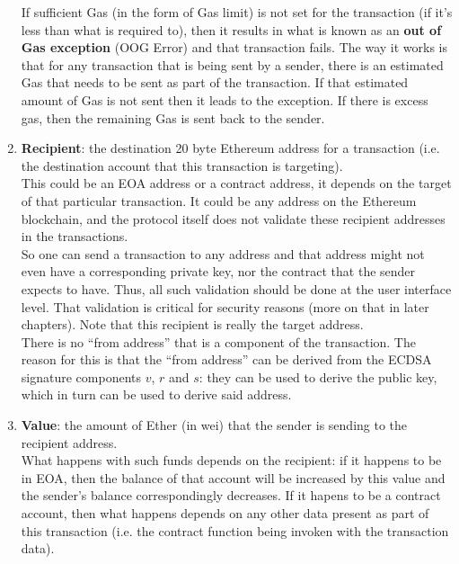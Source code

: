 \begin{enumerate}
    If sufficient Gas (in the form of Gas limit) is not set for the transaction (if it's less than what is required to), then it results in what is known as an \textbf{out of Gas exception} (OOG Error) and that transaction fails.
    The way it works is that for any transaction that is being sent by a sender, there is an estimated Gas that needs to be sent as part of the transaction.
    If that estimated amount of Gas is not sent then it leads to the exception.
    If there is excess gas, then the remaining Gas is sent back to the sender.

    \item\textbf{Recipient}: the destination 20 byte Ethereum address for a transaction (i.e. the destination account that this transaction is targeting).\\
    
    This could be an EOA address or a contract address, it depends on the target of that particular transaction.
    It could be any address on the Ethereum blockchain, and the protocol itself does not validate these recipient addresses in the transactions.\\

    So one can send a transaction to any address and that address might not even have a corresponding private key, nor the contract that the sender expects to have.
    Thus, all such validation should be done at the user interface level.
    That validation is critical for security reasons (more on that in later chapters). Note that this recipient is really the target address.\\

    There is no ``from address'' that is a component of the transaction.
    The reason for this is that the ``from address'' can be derived from the ECDSA signature components $v$, $r$ and $s$: they can be used to derive the public key, which in turn can be used to derive said address.

    \item\textbf{Value}: the amount of Ether (in wei) that the sender is sending to the recipient address.\\

    What happens with such funds depends on the recipient: if it happens to be in EOA, then the balance of that account will be increased by this value and the sender's balance correspondingly decreases.
    If it hapens to be a contract account, then what happens depends on any other data present as part of this transaction (i.e. the contract function being invoken with the transaction data).\\
    

\end{enumerate}
